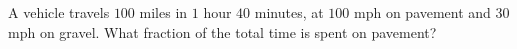 A vehicle travels $100$ miles in $1$ hour $40$ minutes, at $100$ mph on pavement and $30$ mph on gravel. What fraction of the total time is spent on pavement?
